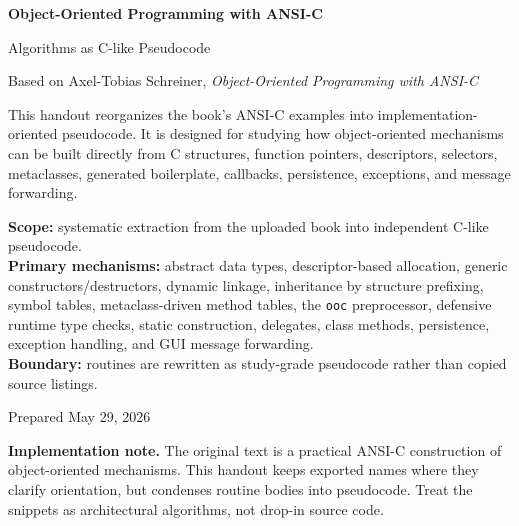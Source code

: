 \documentclass[11pt]{article}
\begin{document}
\hypersetup{pageanchor=false}

\begin{titlepage}
  \centering
  \vspace*{1.4cm}
  {\Huge\bfseries\color{OOPBlue}Object-Oriented Programming with ANSI-C\par}
  \vspace{0.35cm}
  {\LARGE Algorithms as C-like Pseudocode\par}
  \vspace{0.25cm}
  {\large Based on Axel-Tobias Schreiner, \textit{Object-Oriented Programming with ANSI-C}\par}
  \vspace{0.95cm}
  \begin{scopebox}
  This handout reorganizes the book's ANSI-C examples into implementation-oriented pseudocode. It is designed for studying how object-oriented mechanisms can be built directly from C structures, function pointers, descriptors, selectors, metaclasses, generated boilerplate, callbacks, persistence, exceptions, and message forwarding.
  \end{scopebox}
  \vspace{0.75cm}
  \begin{methodbox}
  \textbf{Scope:} systematic extraction from the uploaded book into independent C-like pseudocode.\\
  \textbf{Primary mechanisms:} abstract data types, descriptor-based allocation, generic constructors/destructors, dynamic linkage, inheritance by structure prefixing, symbol tables, metaclass-driven method tables, the \texttt{ooc} preprocessor, defensive runtime type checks, static construction, delegates, class methods, persistence, exception handling, and GUI message forwarding.\\
  \textbf{Boundary:} routines are rewritten as study-grade pseudocode rather than copied source listings.
  \end{methodbox}
  \vfill
  {\large Prepared May 29, 2026\par}
\end{titlepage}

\hypersetup{pageanchor=true}
\tableofcontents
\clearpage
{}

\begin{warningbox}
\textbf{Implementation note.} The original text is a practical ANSI-C construction of object-oriented mechanisms. This handout keeps exported names where they clarify orientation, but condenses routine bodies into pseudocode. Treat the snippets as architectural algorithms, not drop-in source code.
\end{warningbox}
\end{document}
